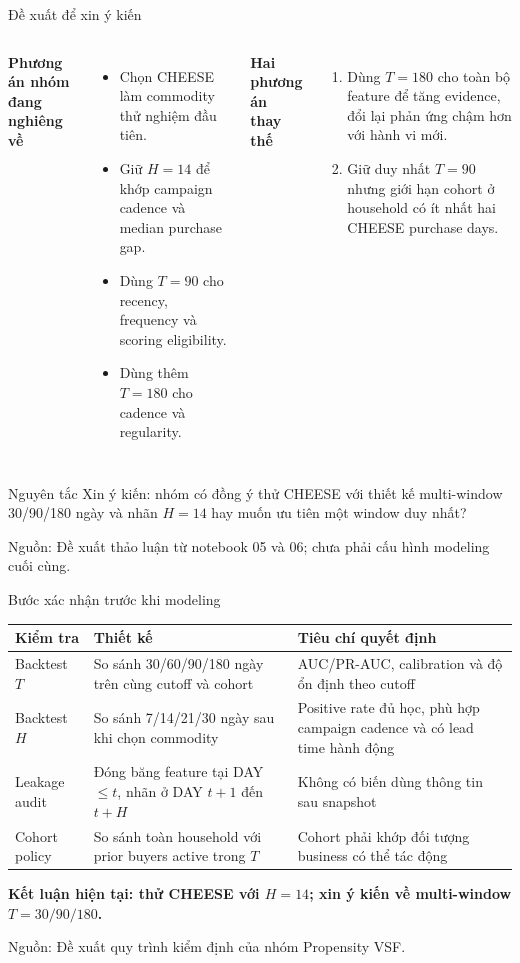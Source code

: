 \documentclass[aspectratio=169,11pt]{beamer}
\newcommand{\src}[1]{\par\vfill{\tiny\color{gray}Nguồn: #1}}
\begin{document}
\begin{frame}{Đề xuất để xin ý kiến}
\begin{columns}[T]
\textbf{Phương án nhóm đang nghiêng về}
\begin{itemize}
\item Chọn CHEESE làm commodity thử nghiệm đầu tiên.
\item Giữ $H=14$ để khớp campaign cadence và median purchase gap.
\item Dùng $T=90$ cho recency, frequency và scoring eligibility.
\item Dùng thêm $T=180$ cho cadence và regularity.
\end{itemize}
\textbf{Hai phương án thay thế}
\begin{enumerate}
\item Dùng $T=180$ cho toàn bộ feature để tăng evidence, đổi lại phản ứng chậm hơn với hành vi mới.
\item Giữ duy nhất $T=90$ nhưng giới hạn cohort ở household có ít nhất hai CHEESE purchase days.
\end{enumerate}
\end{columns}
\medskip
\begin{alertblock}{Nguyên tắc}
Xin ý kiến: nhóm có đồng ý thử CHEESE với thiết kế multi-window 30/90/180 ngày và nhãn $H=14$ hay muốn ưu tiên một window duy nhất?
\end{alertblock}
\src{Đề xuất thảo luận từ notebook 05 và 06; chưa phải cấu hình modeling cuối cùng.}
\end{frame}

\begin{frame}{Bước xác nhận trước khi modeling}
\small
\begin{tabularx}{\textwidth}{@{}p{2.6cm}Y Y@{}}
\toprule
\textbf{Kiểm tra} & \textbf{Thiết kế} & \textbf{Tiêu chí quyết định} \\
\midrule
Backtest $T$ & So sánh 30/60/90/180 ngày trên cùng cutoff và cohort & AUC/PR-AUC, calibration và độ ổn định theo cutoff \\
\addlinespace
Backtest $H$ & So sánh 7/14/21/30 ngày sau khi chọn commodity & Positive rate đủ học, phù hợp campaign cadence và có lead time hành động \\
\addlinespace
Leakage audit & Đóng băng feature tại DAY $\leq t$, nhãn ở DAY $t+1$ đến $t+H$ & Không có biến dùng thông tin sau snapshot \\
\addlinespace
Cohort policy & So sánh toàn household với prior buyers active trong $T$ & Cohort phải khớp đối tượng business có thể tác động \\
\bottomrule
\end{tabularx}
\medskip
\centering
\color{structure.fg}\bfseries Kết luận hiện tại: thử CHEESE với $H=14$; xin ý kiến về multi-window $T=30/90/180$.
\src{Đề xuất quy trình kiểm định của nhóm Propensity VSF.}
\end{frame}
\end{document}
